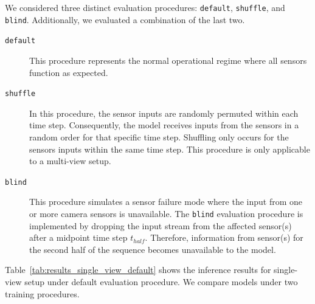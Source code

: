 
We considered three distinct evaluation procedures: \texttt{default}, \texttt{shuffle}, and \texttt{blind}. Additionally, we evaluated a combination of the last two.

\begin{description}
    \item[\texttt{default}] This procedure represents the normal operational regime where all sensors function as expected.

    \item[\texttt{shuffle}] In this procedure, the sensor inputs are randomly permuted within each time step. Consequently, the model receives inputs from the sensors in a random order for that specific time step. Shuffling only occurs for the sensors inputs within the same time step. This procedure is only applicable to a multi-view setup.

    \item[\texttt{blind}] This procedure simulates a sensor failure mode where the input from one or more camera sensors is unavailable. The \texttt{blind} evaluation procedure is implemented by dropping the input stream from the affected sensor(s) after a midpoint time step $t_{half}$. Therefore, information from sensor(s) for the second half of the sequence becomes unavailable to the model. 
\end{description}

Table~\ref{tab:results_single_view_default} shows the inference results for single-view setup under default evaluation procedure. We compare models under two training procedures. 

